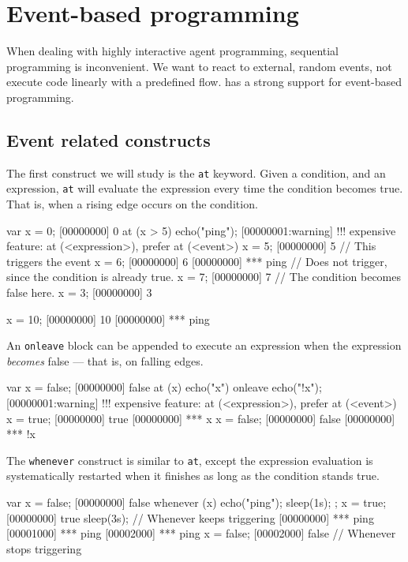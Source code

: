 
\chapter{Event-based programming}
\label{sec:tut:event-prog}

When dealing with highly interactive agent programming, sequential
programming is inconvenient. We want to react to external, random
events, not execute code linearly with a predefined flow. \us has a
strong support for event-based programming.

\section{Event related constructs}

The first construct we will study is the \lstinline|at| keyword. Given
a condition, and an expression, \lstinline|at| will evaluate the
expression every time the condition becomes true. That is,
when a rising edge occurs on the condition.

\begin{urbiscript}
var x = 0;
[00000000] 0
at (x > 5)
  echo("ping");
[00000001:warning] !!! expensive feature: at (<expression>), prefer at (<event>)
x = 5;
[00000000] 5
// This triggers the event
x = 6;
[00000000] 6
[00000000] *** ping
// Does not trigger, since the condition is already true.
x = 7;
[00000000] 7
// The condition becomes false here.
x = 3;
[00000000] 3

x = 10;
[00000000] 10
[00000000] *** ping
\end{urbiscript}

An \lstinline|onleave| block can be appended to execute an expression
when the expression \emph{becomes} false --- that is, on falling edges.

\begin{urbiscript}
var x = false;
[00000000] false
at (x)
  echo("x")
onleave
  echo("!x");
[00000001:warning] !!! expensive feature: at (<expression>), prefer at (<event>)
x = true;
[00000000] true
[00000000] *** x
x = false;
[00000000] false
[00000000] *** !x
\end{urbiscript}

The \lstinline|whenever| construct is similar to \lstinline|at|,
except the expression evaluation is systematically restarted when it
finishes as long as the condition stands true.

\begin{urbiscript}
var x = false;
[00000000] false
whenever (x)
{
  echo("ping");
  sleep(1s);
};
x = true;
[00000000] true
sleep(3s);
// Whenever keeps triggering
[00000000] *** ping
[00001000] *** ping
[00002000] *** ping
x = false;
[00002000] false
// Whenever stops triggering
\end{urbiscript}

